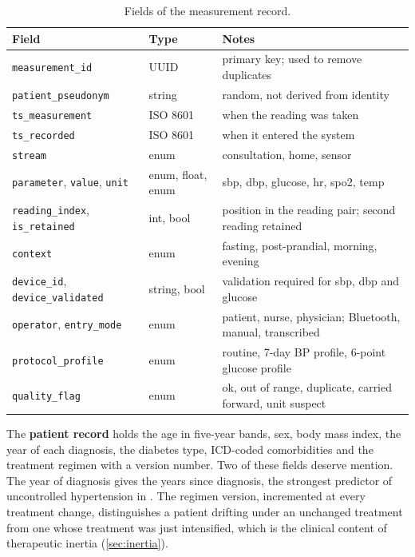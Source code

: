 \begin{table}[htbp]
\centering\footnotesize
\caption{Fields of the measurement record.}\label{tab:measurement-record}
\begin{tabularx}{\textwidth}{@{}>{\raggedright\arraybackslash}p{3.1cm} >{\raggedright\arraybackslash}p{2.4cm} X@{}}
\toprule
\textbf{Field} & \textbf{Type} & \textbf{Notes} \\
\midrule
\texttt{measurement\_id} & UUID & primary key; used to remove duplicates \\
\texttt{patient\_pseudonym} & string & random, not derived from identity \\
\texttt{ts\_measurement} & ISO 8601 & when the reading was taken \\
\texttt{ts\_recorded} & ISO 8601 & when it entered the system \\
\texttt{stream} & enum & consultation, home, sensor \\
\texttt{parameter}, \texttt{value}, \texttt{unit} & enum, float, enum & sbp, dbp, glucose, hr, spo2, temp \\
\texttt{reading\_index}, \texttt{is\_retained} & int, bool & position in the reading pair; second reading retained \\
\texttt{context} & enum & fasting, post-prandial, morning, evening \\
\texttt{device\_id}, \texttt{device\_validated} & string, bool & validation required for sbp, dbp and glucose \\
\texttt{operator}, \texttt{entry\_mode} & enum & patient, nurse, physician; Bluetooth, manual, transcribed \\
\texttt{protocol\_profile} & enum & routine, 7-day BP profile, 6-point glucose profile \\
\texttt{quality\_flag} & enum & ok, out of range, duplicate, carried forward, unit suspect \\
\bottomrule
\end{tabularx}
\end{table}

The \textbf{patient record} holds the age in five-year bands, sex, body mass index, the year of each diagnosis, the diabetes type, ICD-coded comorbidities and the treatment regimen with a version number. Two of these fields deserve mention. The year of diagnosis gives the years since diagnosis, the strongest predictor of uncontrolled hypertension in \textcite{mendoza2025}. The regimen version, incremented at every treatment change, distinguishes a patient drifting under an unchanged treatment from one whose treatment was just intensified, which is the clinical content of therapeutic inertia (\cref{sec:inertia}).

